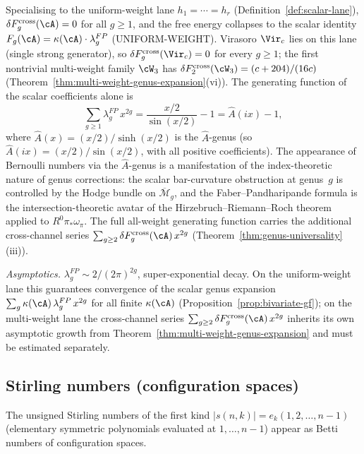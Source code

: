 Specialising to the uniform-weight lane
$h_1 = \cdots = h_r$ (Definition~\ref{def:scalar-lane}),
$\delta F_g^{\mathrm{cross}}(\cA)=0$ for all $g \geq 1$, and the
free energy collapses to the scalar identity
$F_g(\cA) = \kappa(\cA)\cdot\lambda_g^{FP}$ \textup{(}UNIFORM-WEIGHT\textup{)}.
Virasoro $\Vir_c$ lies on this lane (single strong generator),
so $\delta F_g^{\mathrm{cross}}(\Vir_c)=0$ for every $g \geq 1$;
the first nontrivial multi-weight family $\cW_3$ has
$\delta F_2^{\mathrm{cross}}(\cW_3) = (c+204)/(16c)$
(Theorem~\ref{thm:multi-weight-genus-expansion}\textup{(vi)}).
The generating function of the scalar coefficients alone is
\[
\sum_{g \geq 1} \lambda_g^{FP}\, x^{2g}
= \frac{x/2}{\sin(x/2)} - 1
= \hat{A}(ix) - 1,
\]
where $\hat{A}(x) = (x/2)/\sinh(x/2)$ is the $\hat{A}$-genus (so
$\hat{A}(ix) = (x/2)/\sin(x/2)$, with all positive coefficients).
The appearance of Bernoulli numbers via the $\hat{A}$-genus is a
manifestation of the index-theoretic nature of genus corrections:
the scalar bar-curvature obstruction at genus~$g$ is controlled by
the Hodge bundle on $\overline{\mathcal{M}}_g$, and the
Faber--Pandharipande formula is the intersection-theoretic avatar
of the Hirzebruch--Riemann--Roch theorem applied to
$R^0\pi_*\omega_\pi$. The full all-weight generating function
carries the additional cross-channel series
$\sum_{g \geq 2}\delta F_g^{\mathrm{cross}}(\cA)\,x^{2g}$
(Theorem~\ref{thm:genus-universality}\textup{(iii)}).

\emph{Asymptotics.}
$\lambda_g^{FP} \sim 2/(2\pi)^{2g}$, super-exponential decay.
On the uniform-weight lane this guarantees convergence of the
scalar genus expansion $\sum_g \kappa(\cA)\,\lambda_g^{FP}\,x^{2g}$
for all finite $\kappa(\cA)$
(Proposition~\ref{prop:bivariate-gf}); on the multi-weight lane the
cross-channel series $\sum_{g \geq 2}\delta F_g^{\mathrm{cross}}(\cA)\,x^{2g}$
inherits its own asymptotic growth from
Theorem~\ref{thm:multi-weight-genus-expansion} and must be
estimated separately.

\subsection{Stirling numbers (configuration spaces)}
\label{subsec:stirling}

The unsigned Stirling numbers of the first kind $|s(n,k)| = e_k(1, 2, \ldots, n-1)$ (elementary symmetric polynomials evaluated at $1, \ldots, n-1$) appear as Betti numbers of configuration spaces.

